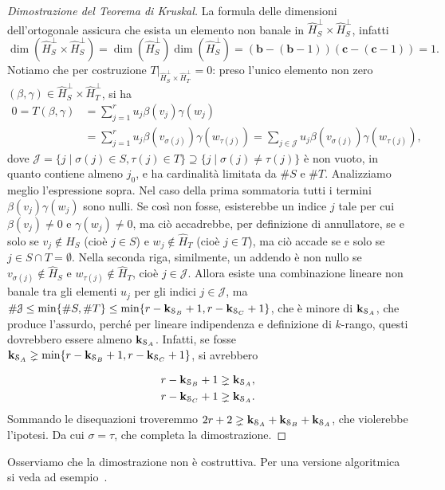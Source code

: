 \begin{proof}[Dimostrazione del Teorema di Kruskal]
	La formula delle dimensioni dell'ortogonale assicura che esista un elemento non banale in $
		\hat{H}_{S}^\perp \times \hat{H}_{S}^\perp $, infatti
	\begin{equation*}
		\dim(\hat{H}_{S}^\perp \times \hat{H}_{S}^\perp) =   \dim(\hat{H}_{S}^\perp)
		\dim(\hat{H}_{S}^\perp) = (\bm{b} - (\bm{b} - 1))(\bm{c} - (\bm{c} - 1)) = 1.
	\end{equation*}
	Notiamo che per costruzione $ T\big|_{\hat{H}_{S}^\perp \times \hat{H}_{T}^\perp} = 0$: preso
	l'unico elemento non zero $ (\beta,\gamma) \in \hat{H}_S^\perp \times \hat{H}_T^\perp $, si ha
	\begin{align*}
		0 = T(\beta,\gamma) & = \sum_{j=1}^r u_j\beta(v_j)\gamma(w_j)                                   \\
		                    & = \sum_{j=1}^r u_j \beta(v_{\sigma(j)})\gamma(w_{\tau(j)}) =  \sum_{j \in
			\mathcal{J}} u_j \beta(v_{\sigma(j)})\gamma(w_{\tau(j)}),
	\end{align*}
	dove $ \mathcal{J} = \{j \mid \sigma(j) \in S, \tau(j) \in T\} \supseteq \{j \mid \sigma(j) \neq
		\tau(j)\} $ è non vuoto, in quanto contiene almeno $ j_0 $, e ha cardinalità limitata da $ \#S $ e $ \#T $.
	Analizziamo meglio l'espressione sopra. Nel caso della prima sommatoria tutti i termini $
		\beta(v_{j})\gamma(w_{j}) $ sono nulli. Se così non fosse, esisterebbe un indice $ j $ tale per cui  $
		\beta(v_j) \neq 0 $ e $ \gamma(w_j) \neq 0 $, ma ciò accadrebbe, per definizione di annullatore, se
	e solo se $ v_j \not\in \hat{H}_S $ (cioè $ j \in S $) e $ w_j \not\in
		\hat{H}_T $ (cioè $ j\in T $), ma ciò accade se e solo se $ j \in S \cap T = \emptyset$. Nella seconda riga, similmente, un addendo è non nullo
	se $ v_{\sigma(j)} \not\in
		\hat{H}_S$ e $ w_{\tau(j)} \not\in \hat{H}_T $, cioè $ j \in \mathcal{J} $.
	Allora esiste una combinazione lineare non banale tra gli elementi $ u_j $ per gli indici $ j \in
		\mathcal{J} $, ma $ \#\mathcal{J} \le \min \{\#S, \#T\}  \le \min \{r - \mathbf{k}_{\mathcal{S}_B} + 1, r -
		\mathbf{k}_{\mathcal{S}_C} + 1\}  $, che è minore di $ \mathbf{k}_{\mathcal{S}_A} $, che produce l'assurdo, perché per lineare indipendenza e
	definizione di $ k $-rango, questi dovrebbero essere almeno $ \mathbf{k}_{\mathcal{S}_{A}} $. Infatti, se fosse
	$\mathbf{k}_{\mathcal{S}_A} \gneq \min \{r - \mathbf{k}_{\mathcal{S}_B} + 1, r - \mathbf{k}_{\mathcal{S}_C} + 1\}$, si avrebbero

	\begin{equation*}
		\begin{aligned}
			r - \mathbf{k}_{\mathcal{S}_B} + 1 & \gneq \mathbf{k}_{\mathcal{S}_A}, \\
			r - \mathbf{k}_{\mathcal{S}_C} + 1 & \gneq \mathbf{k}_{\mathcal{S}_A}.
		\end{aligned}
	\end{equation*}
	Sommando le disequazioni troveremmo $ 2r + 2 \gneq \mathbf{k}_{\mathcal{S}_A} + \mathbf{k}_{\mathcal{S}_B} + \mathbf{k}_{\mathcal{S}_A} $, che violerebbe
	l'ipotesi.
	Da cui $ \sigma = \tau $, che completa la dimostrazione.
\end{proof}
\begin{remark}
	Osserviamo che la dimostrazione non è costruttiva. Per una versione algoritmica si veda ad esempio~\cite{bhargava2026algorithmic}.
\end{remark}

